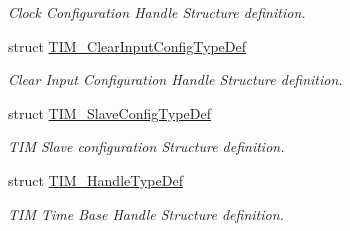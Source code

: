 \begin{DoxyCompactItemize}
\begin{DoxyCompactList}\small\item\em Clock Configuration Handle Structure definition. \end{DoxyCompactList}\item 
struct \hyperlink{struct_t_i_m___clear_input_config_type_def}{T\+I\+M\+\_\+\+Clear\+Input\+Config\+Type\+Def}
\begin{DoxyCompactList}\small\item\em Clear Input Configuration Handle Structure definition. \end{DoxyCompactList}\item 
struct \hyperlink{struct_t_i_m___slave_config_type_def}{T\+I\+M\+\_\+\+Slave\+Config\+Type\+Def}
\begin{DoxyCompactList}\small\item\em T\+IM Slave configuration Structure definition. \end{DoxyCompactList}\item 
struct \hyperlink{struct_t_i_m___handle_type_def}{T\+I\+M\+\_\+\+Handle\+Type\+Def}
\begin{DoxyCompactList}\small\item\em T\+IM Time Base Handle Structure definition. \end{DoxyCompactList}\end{DoxyCompactItemize}

